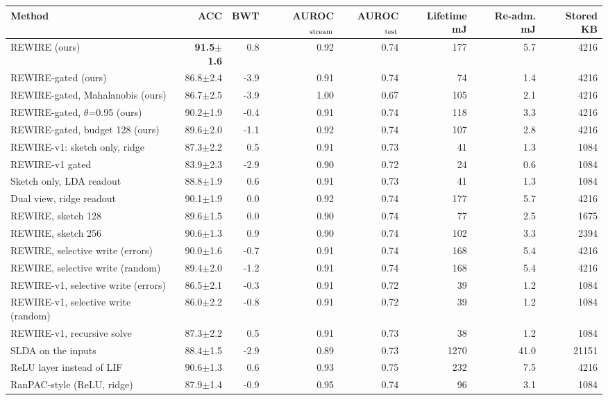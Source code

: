 \begin{tabular}{lrrrrrrr}
\toprule
Method & ACC & BWT & AUROC$_{\rm stream}$ & AUROC$_{\rm test}$ & Lifetime mJ & Re-adm. mJ & Stored KB \\
\midrule
REWIRE (ours) & \textbf{91.5{\tiny$\pm$1.6}} & 0.8 & 0.92 & 0.74 & 177 & 5.7 & 4216 \\
REWIRE-gated (ours) & 86.8{\tiny$\pm$2.4} & -3.9 & 0.91 & 0.74 & 74 & 1.4 & 4216 \\
REWIRE-gated, Mahalanobis (ours) & 86.7{\tiny$\pm$2.5} & -3.9 & 1.00 & 0.67 & 105 & 2.1 & 4216 \\
REWIRE-gated, $\theta$=0.95 (ours) & 90.2{\tiny$\pm$1.9} & -0.4 & 0.91 & 0.74 & 118 & 3.3 & 4216 \\
REWIRE-gated, budget 128 (ours) & 89.6{\tiny$\pm$2.0} & -1.1 & 0.92 & 0.74 & 107 & 2.8 & 4216 \\
REWIRE-v1: sketch only, ridge & 87.3{\tiny$\pm$2.2} & 0.5 & 0.91 & 0.73 & 41 & 1.3 & 1084 \\
REWIRE-v1 gated & 83.9{\tiny$\pm$2.3} & -2.9 & 0.90 & 0.72 & 24 & 0.6 & 1084 \\
Sketch only, LDA readout & 88.8{\tiny$\pm$1.9} & 0.6 & 0.91 & 0.73 & 41 & 1.3 & 1084 \\
Dual view, ridge readout & 90.1{\tiny$\pm$1.9} & 0.0 & 0.92 & 0.74 & 177 & 5.7 & 4216 \\
REWIRE, sketch 128 & 89.6{\tiny$\pm$1.5} & 0.0 & 0.90 & 0.74 & 77 & 2.5 & 1675 \\
REWIRE, sketch 256 & 90.6{\tiny$\pm$1.3} & 0.9 & 0.90 & 0.74 & 102 & 3.3 & 2394 \\
REWIRE, selective write (errors) & 90.0{\tiny$\pm$1.6} & -0.7 & 0.91 & 0.74 & 168 & 5.4 & 4216 \\
REWIRE, selective write (random) & 89.4{\tiny$\pm$2.0} & -1.2 & 0.91 & 0.74 & 168 & 5.4 & 4216 \\
REWIRE-v1, selective write (errors) & 86.5{\tiny$\pm$2.1} & -0.3 & 0.91 & 0.72 & 39 & 1.2 & 1084 \\
REWIRE-v1, selective write (random) & 86.0{\tiny$\pm$2.2} & -0.8 & 0.91 & 0.72 & 39 & 1.2 & 1084 \\
REWIRE-v1, recursive solve & 87.3{\tiny$\pm$2.2} & 0.5 & 0.91 & 0.73 & 38 & 1.2 & 1084 \\
SLDA on the inputs & 88.4{\tiny$\pm$1.5} & -2.9 & 0.89 & 0.73 & 1270 & 41.0 & 21151 \\
ReLU layer instead of LIF & 90.6{\tiny$\pm$1.3} & 0.6 & 0.93 & 0.75 & 232 & 7.5 & 4216 \\
RanPAC-style (ReLU, ridge) & 87.9{\tiny$\pm$1.4} & -0.9 & 0.95 & 0.74 & 96 & 3.1 & 1084 \\

\end{tabular}

